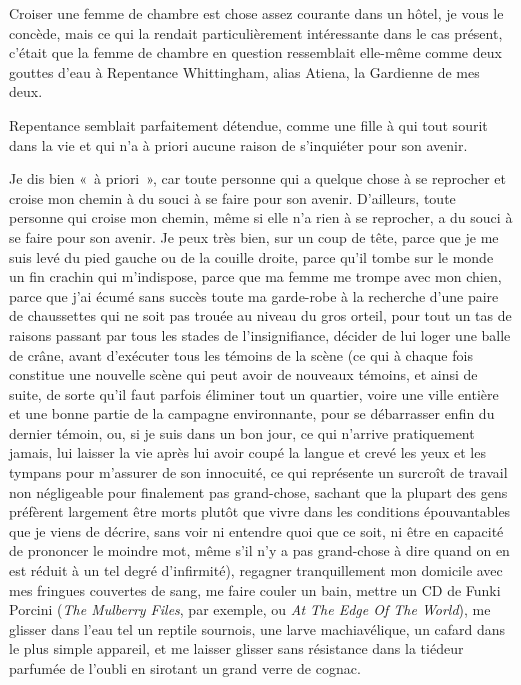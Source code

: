Croiser une femme de chambre est chose assez courante dans un hôtel, je vous le concède, mais ce qui la rendait particulièrement intéressante dans le cas présent, c’était que la femme de chambre en question ressemblait elle-même comme deux gouttes d’eau à Repentance Whittingham, alias Atiena, la Gardienne de mes deux.

Repentance semblait parfaitement détendue, comme une fille à qui tout sourit dans la vie et qui n’a à priori aucune raison de s’inquiéter pour son avenir.

Je dis bien «~à priori~», car toute personne qui a quelque chose à se reprocher et croise mon chemin à du souci à se faire pour son avenir. D’ailleurs, toute personne qui croise mon chemin, même si elle n’a rien à se reprocher, a du souci à se faire pour son avenir. Je peux très bien, sur un coup de tête, parce que je me suis levé du pied gauche ou de la couille droite, parce qu’il tombe sur le monde un fin crachin qui m’indispose, parce que ma femme me trompe avec mon chien, parce que j’ai écumé sans succès toute ma garde-robe à la recherche d’une paire de chaussettes qui ne soit pas trouée au niveau du gros orteil, pour tout un tas de raisons passant par tous les stades de l’insignifiance, décider de lui loger une balle de crâne, avant d’exécuter tous les témoins de la scène (ce qui à chaque fois constitue une nouvelle scène qui peut avoir de nouveaux témoins, et ainsi de suite, de sorte qu’il faut parfois éliminer tout un quartier, voire une ville entière et une bonne partie de la campagne environnante, pour se débarrasser enfin du dernier témoin, ou, si je suis dans un bon jour, ce qui n’arrive pratiquement jamais, lui laisser la vie après lui avoir coupé la langue et crevé les yeux et les tympans pour m’assurer de son innocuité, ce qui représente un surcroît de travail non négligeable pour finalement pas grand-chose, sachant que la plupart des gens préfèrent largement être morts plutôt que vivre dans les conditions épouvantables que je viens de décrire, sans voir ni entendre quoi que ce soit, ni être en capacité de prononcer le moindre mot, même s’il n’y a pas grand-chose à dire quand on en est réduit à un tel degré d’infirmité), regagner tranquillement mon domicile avec mes fringues couvertes de sang, me faire couler un bain, mettre un CD de Funki Porcini (\textit{The Mulberry Files}, par exemple, ou \textit{At The Edge Of The World}), me glisser dans l’eau tel un reptile sournois, une larve machiavélique, un cafard dans le plus simple appareil, et me laisser glisser sans résistance dans la tiédeur parfumée de l’oubli en sirotant un grand verre de cognac.


